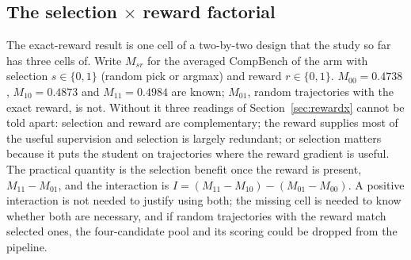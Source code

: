\documentclass[11pt,a4paper]{article}
\begin{document}
\subsection{The selection \texorpdfstring{$\times$}{x} reward factorial}
\label{sec:factorial}
The exact-reward result is one cell of a two-by-two design that the study so far has three cells of. Write $M_{sr}$ for the averaged CompBench of the arm with selection $s\in\{0,1\}$ (random pick or argmax) and reward $r\in\{0,1\}$. $M_{00}=0.4738$, $M_{10}=0.4873$ and $M_{11}=0.4984$ are known; $M_{01}$, random trajectories with the exact reward, is not. Without it three readings of Section~\ref{sec:rewardx} cannot be told apart: selection and reward are complementary; the reward supplies most of the useful supervision and selection is largely redundant; or selection matters because it puts the student on trajectories where the reward gradient is useful. The practical quantity is the selection benefit once the reward is present, $M_{11}-M_{01}$, and the interaction is $I=(M_{11}-M_{10})-(M_{01}-M_{00})$. A positive interaction is not needed to justify using both; the missing cell is needed to know whether both are necessary, and if random trajectories with the reward match selected ones, the four-candidate pool and its scoring could be dropped from the pipeline.
\end{document}
